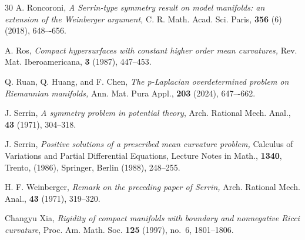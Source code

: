 \documentclass[12pt]{amsart}
\theoremstyle{plain}
\numberwithin{equation}{section}
\begin{document}
\begin{thebibliography}{30}
 A. Roncoroni, \emph{A Serrin-type symmetry result on model manifolds: an extension of the Weinberger argument,} C. R. Math. Acad. Sci. Paris, {\bf 356} (6) (2018), 648–-656.

	

 A. Ros, \emph{Compact hypersurfaces with constant higher order mean curvatures,} Rev. Mat.
Iberoamericana, {\bf 3} (1987), 447–453.



 Q. Ruan, Q. Huang, and F. Chen, \emph{The p-Laplacian overdetermined problem on Riemannian manifolds,} Ann. Mat. Pura Appl., {\bf 203} (2024), 647–-662.


 J. Serrin, \emph{A symmetry problem in potential theory}, Arch. Rational Mech. Anal., {\bf 43} (1971), 304–318.

 J. Serrin,
\emph{Positive solutions of a prescribed mean curvature problem,}
Calculus of Variations and Partial Differential Equations, Lecture Notes in Math., {\bf 1340}, Trento, (1986), Springer, Berlin (1988), 248--255.

 H. F. Weinberger, \emph{Remark on the preceding paper of Serrin,} Arch. Rational Mech. Anal., {\bf 43} (1971), 319–320.

Changyu Xia, \emph{Rigidity of compact manifolds with boundary and nonnegative {Ricci} curvature}, Proc. Am. Math. Soc. \textbf{125} (1997), no.~6, 1801--1806.




\end{thebibliography}
\end{document}
